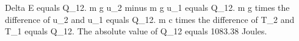 Delta E equals Q_12. 
m g u_2 minus m g u_1 equals Q_12. 
m g times the difference of u_2 and u_1 equals Q_12. 
m c times the difference of T_2 and T_1 equals Q_12. 
The absolute value of Q_12 equals 1083.38 Joules.